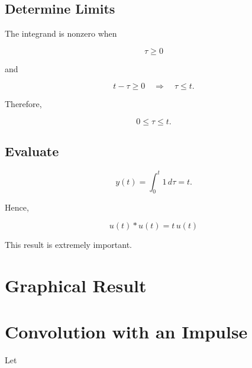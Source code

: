 
\subsection{Determine Limits}

The integrand is nonzero when

\[
\tau\ge0
\]

and

\[
t-\tau\ge0
\quad\Rightarrow\quad
\tau\le t.
\]

Therefore,

\[
0\le\tau\le t.
\]


\subsection{Evaluate}

\[
y(t)=\int_0^t 1\,d\tau=t.
\]

Hence,

\[
\boxed{
u(t)*u(t)=t\,u(t)
}
\]

This result is extremely important.


\section{Graphical Result}

\begin{center}
\end{center}


\section{Convolution with an Impulse}

Let

